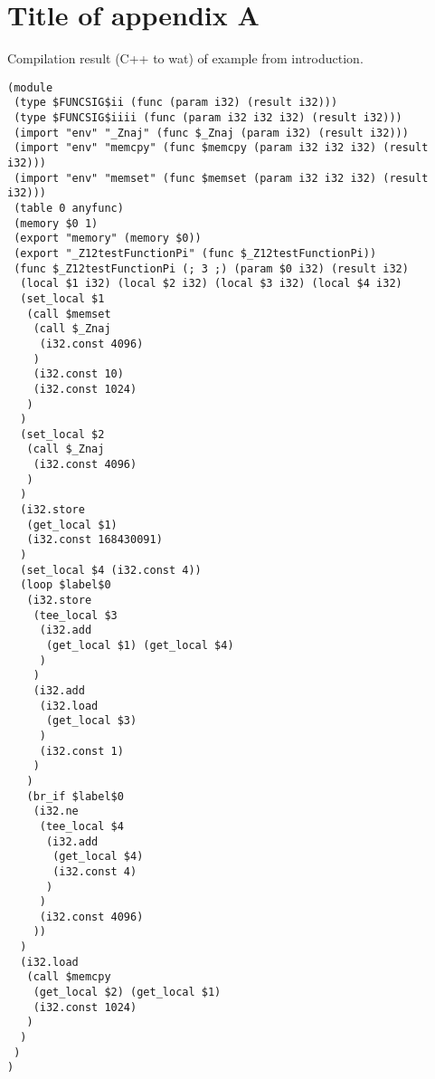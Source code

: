 \chapter{Title of appendix A}

Compilation result (C++ to wat) of example from introduction.

\small

\begin{verbatim}
(module
 (type $FUNCSIG$ii (func (param i32) (result i32)))
 (type $FUNCSIG$iiii (func (param i32 i32 i32) (result i32)))
 (import "env" "_Znaj" (func $_Znaj (param i32) (result i32)))
 (import "env" "memcpy" (func $memcpy (param i32 i32 i32) (result i32)))
 (import "env" "memset" (func $memset (param i32 i32 i32) (result i32)))
 (table 0 anyfunc)
 (memory $0 1)
 (export "memory" (memory $0))
 (export "_Z12testFunctionPi" (func $_Z12testFunctionPi))
 (func $_Z12testFunctionPi (; 3 ;) (param $0 i32) (result i32)
  (local $1 i32) (local $2 i32) (local $3 i32) (local $4 i32)
  (set_local $1
   (call $memset
    (call $_Znaj
     (i32.const 4096)
    )
    (i32.const 10)
    (i32.const 1024)
   )
  )
  (set_local $2
   (call $_Znaj
    (i32.const 4096)
   )
  )
  (i32.store
   (get_local $1)
   (i32.const 168430091)
  )
  (set_local $4 (i32.const 4))
  (loop $label$0
   (i32.store
    (tee_local $3
     (i32.add
      (get_local $1) (get_local $4)
     )
    )
    (i32.add
     (i32.load
      (get_local $3)
     )
     (i32.const 1)
    )
   )
   (br_if $label$0
    (i32.ne
     (tee_local $4
      (i32.add
       (get_local $4)
       (i32.const 4)
      )
     )
     (i32.const 4096)
    ))
  )
  (i32.load
   (call $memcpy
    (get_local $2) (get_local $1)
    (i32.const 1024)
   )
  )
 )
)
\end{verbatim}
\normalsize